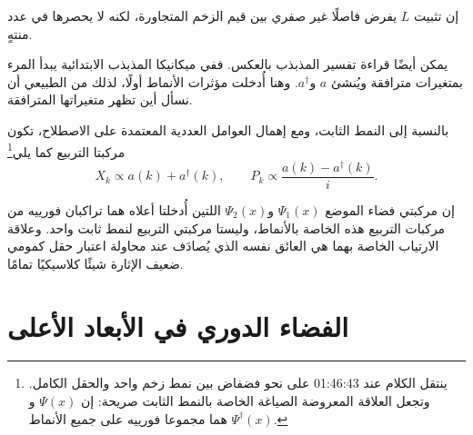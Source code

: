 إن تثبيت \(L\) يفرض فاصلًا غير صفري بين قيم الزخم المتجاورة، لكنه لا يحصرها في عدد منتهٍ.

\begin{classroomqa}
\end{classroomqa}

يمكن أيضًا قراءة تفسير المذبذب بالعكس. ففي ميكانيكا المذبذب الابتدائية يبدأ المرء بمتغيرات مترافقة ويُنشئ \(a\) و\(a^\dagger\). وهنا أُدخلت مؤثرات الأنماط أولًا، لذلك من الطبيعي أن نسأل أين تظهر متغيراتها المترافقة.

\begin{classroomqa}
\end{classroomqa}

بالنسبة إلى النمط الثابت، ومع إهمال العوامل العددية المعتمدة على الاصطلاح، تكون مركبتا التربيع كما يلي\footnote{ينتقل الكلام عند 01:46:43 على نحو فضفاض بين نمط زخم واحد والحقل الكامل. وتجعل العلاقة المعروضة الصياغة الخاصة بالنمط الثابت صريحة: إن \(\Psi(x)\) و\(\Psi^\dagger(x)\) هما مجموعا فورييه على جميع الأنماط.}
\begin{equation}
X_k\propto a(k)+a^\dagger(k),
\qquad
P_k\propto \frac{a(k)-a^\dagger(k)}{i}.
\end{equation}

إن مركبتي فضاء الموضع \(\Psi_1(x)\) و\(\Psi_2(x)\) اللتين أُدخلتا أعلاه هما تراكبان فورييه من مركبات التربيع هذه الخاصة بالأنماط، وليستا مركبتي التربيع لنمط ثابت واحد. وعلاقة الارتياب الخاصة بهما هي العائق نفسه الذي يُصادَف عند محاولة اعتبار حقل كمومي ضعيف الإثارة شيئًا كلاسيكيًا تمامًا.

\section{الفضاء الدوري في الأبعاد الأعلى}

